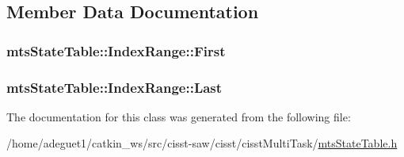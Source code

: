 \subsection{Member Data Documentation}
\hypertarget{classmts_state_table_1_1_index_range_aacc156c9559103d4bc2092d96cbe91b0}{
\subsubsection[{First}]{ mts\-State\-Table\-::\-Index\-Range\-::\-First}}\label{classmts_state_table_1_1_index_range_aacc156c9559103d4bc2092d96cbe91b0}
\hypertarget{classmts_state_table_1_1_index_range_aa356fdcec51fde7c65c44e768d68258f}{
\subsubsection[{Last}]{ mts\-State\-Table\-::\-Index\-Range\-::\-Last}}\label{classmts_state_table_1_1_index_range_aa356fdcec51fde7c65c44e768d68258f}


The documentation for this class was generated from the following file\-:\begin{DoxyCompactItemize}
\item 
/home/adeguet1/catkin\-\_\-ws/src/cisst-\/saw/cisst/cisst\-Multi\-Task/\hyperlink{mts_state_table_8h}{mts\-State\-Table.\-h}\end{DoxyCompactItemize}

